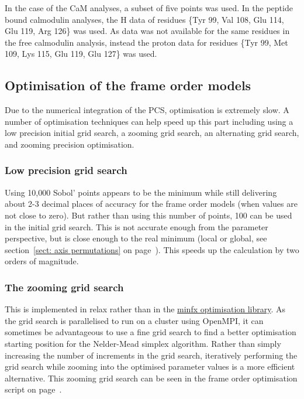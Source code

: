 In the case of the CaM analyses, a subset of five points was used.
In the peptide bound calmodulin analyses, the H data of residues \{Tyr 99, Val 108, Glu 114, Glu 119, Arg 126\} was used.
As data was not available for the same residues in the free calmodulin analysis, instead the proton data for residues \{Tyr 99, Met 109, Lys 115, Glu 119, Glu 127\} was used.





\subsection{Optimisation of the frame order models}

Due to the numerical integration of the PCS, optimisation is extremely slow.
A number of optimisation techniques can help speed up this part including using a low precision initial grid search, a zooming grid search, an alternating grid search, and zooming precision optimisation.






\subsubsection{Low precision grid search}

Using 10,000 Sobol' points appears to be the minimum while still delivering about 2-3 decimal places of accuracy for the frame order models (when values are not close to zero).
But rather than using this number of points, 100 can be used in the initial grid search.
This is not accurate enough from the parameter perspective, but is close enough to the real minimum (local or global, see section~\ref{sect: axis permutations} on page~\pageref{sect: axis permutations}).
This speeds up the calculation by two orders of magnitude.





\subsubsection{The zooming grid search}

This is implemented in relax rather than in the \href{https://sourceforge.net/projects/minfx/}{minfx optimisation library}.
As the grid search is parallelised to run on a cluster using OpenMPI, it can sometimes be advantageous to use a fine grid search to find a better optimisation starting position for the Nelder-Mead simplex algorithm.
Rather than simply increasing the number of increments in the grid search, iteratively performing the grid search while zooming into the optimised parameter values is a more efficient alternative.
This zooming grid search can be seen in the frame order optimisation script on page~\pageref{sect: frame order analysis script}.




